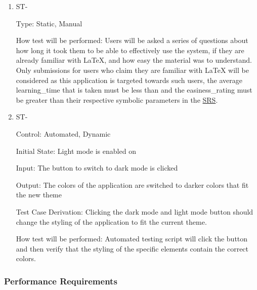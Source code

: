 \documentclass[12pt, titlepage]{article}
\newcounter{TESTID}
\newcommand\TESTNUM{\stepcounter{TESTID}\theTESTID}
\begin{document}
	\begin{enumerate}
		
		\item{ST-\TESTNUM\\}
		
		Type: Static, Manual
		
		How test will be performed: Users will be asked a series of questions about how long it took them to be able to effectively use the system, if they are already familiar with LaTeX, and how easy the material was to understand. Only submissions for users who claim they are familiar with LaTeX will be considered as this application is targeted towards such users, the average learning\_time that is taken must be less than and the easiness\_rating must be greater than their respective symbolic parameters in the \href{https://github.com/RutheniumVI/UnderTree/blob/main/docs/SRS/SRS.pdf}{SRS}.
		
		\item{ST-\TESTNUM\\}
		
		Control: Automated, Dynamic
		
		Initial State: Light mode is enabled on 
		
		Input: The button to switch to dark mode is clicked
		
		Output: The colors of the application are switched to darker colors that fit the new theme
		
		Test Case Derivation: Clicking the dark mode and light mode button should change the styling of the application to fit the current theme.
		
		How test will be performed: Automated testing script will click the button and then verify that the styling of the specific elements contain the correct colors.
		
	\end{enumerate}
	
	\subsubsection{Performance Requirements}
	
\end{document}
